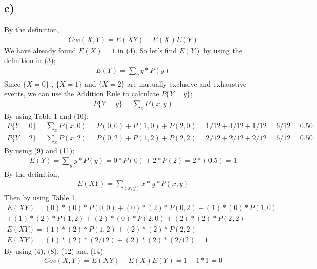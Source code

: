 \documentclass[12pt]{article}
\begin{document}
\subsection*{c)} By the definition,
\begin{equation} 
\begin{split}
Cov(X,Y) = E(XY) -E(X)E(Y)
\end{split}
\end{equation}
We have already found $E(X) = 1$ in (4). So let's find $E(Y)$ by using the definition in (3);
\begin{equation} 
\begin{split}
E(Y) = \sum_{y} y*P(y)
\end{split}
\end{equation}
Since $\{X=0\}$ , $\{X=1\}$ and $\{X=2\}$ are mutually exclusive and exhaustive events, we can use the Addition Rule to calculate $P\{Y=y\}$;
\begin{equation} 
\begin{split}
P\{Y=y\} = \sum_{x} P(x,y)
\end{split}
\end{equation}
By using Table 1 and (10);
\begin{equation} 
\begin{split}
P\{Y=0\} = \sum_{x} P(x,0) = P(0,0) + P(1,0) + P(2,0) = 1/12 + 4/12 + 1/12 = 6/12 = 0.50 \\
P\{Y=2\} = \sum_{x} P(x,2) = P(0,2) + P(1,2) + P(2,2) = 2/12 + 2/12 + 2/12 = 6/12 = 0.50 
\end{split}
\end{equation}
By using (9) and (11);
\begin{equation} 
\begin{split}
E(Y) = \sum_{y} y*P(y) = 0*P(0) + 2*P(2) = 2*(0.5) = 1
\end{split}
\end{equation}
By the definition,
\begin{equation} 
\begin{split}
E(XY) = \sum_{(x,y)}x*y*P(x,y)
\end{split}
\end{equation}
Then by using Table 1, 
\begin{equation} 
\begin{split}
E(XY) = (0)*(0)*P(0,0) + (0)*(2)*P(0,2) + (1)*(0)*P(1,0) \\ + (1)*(2)*P(1,2)+ (2)*(0)*P(2,0) + (2)*(2)*P(2,2) \\
E(XY) = (1)*(2)*P(1,2) + (2)*(2)*P(2,2) \\
E(XY) = (1)*(2)*(2/12) + (2)*(2)*(2/12) = 1
\end{split}
\end{equation}
By using (4), (8), (12) and (14)
\begin{equation*} 
\begin{split}
Cov(X,Y) = E(XY) -E(X)E(Y) = 1 - 1*1 = 0
\end{split}
\end{equation*}
\end{document}
